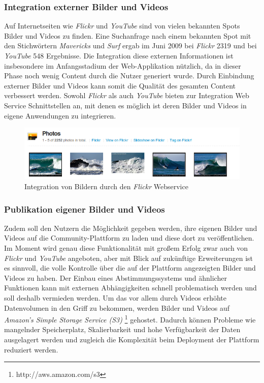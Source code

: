 \subsubsection{Integration externer Bilder und Videos}
Auf Internetseiten wie \textit{Flickr} und \textit{YouTube} sind von
vielen bekannten Spots Bilder und Videos zu finden. Eine Suchanfrage
nach einem bekannten Spot mit den Stichwörtern \textit{Mavericks} und
\textit{Surf} ergab im Juni 2009 bei \textit{Flickr} 2319 und bei
\textit{YouTube} 548 Ergebnisse. Die Integration diese externen
Informationen ist insbesondere im Anfangsstadium der Web-Applikation
nützlich, da in dieser Phase noch wenig Content durch die Nutzer
generiert wurde. Durch Einbindung externer Bilder und Videos kann
somit die Qualität des gesamten Content verbessert werden. Sowohl
\textit{Flickr} als auch \textit{YouTube} bieten zur Integration Web
Service Schnittstellen an, mit denen es möglich ist deren Bilder und
Videos in eigene Anwendungen zu integrieren.

\begin{figure}[h]
 \includegraphics[width=\textwidth]{bilder/photos-flickr}
 \caption{Integration von Bildern durch den \textit{Flickr}
      Webservice}
 \label{photos-flickr}
\end{figure}

\subsubsection{Publikation eigener Bilder und Videos}
Zudem soll den Nutzern die Möglichkeit gegeben werden, ihre eigenen
Bilder und Videos auf die Community-Plattform zu laden und diese dort
zu veröffentlichen. Im Moment wird genau diese Funktionalität mit
großem Erfolg zwar auch von \textit{Flickr} und \textit{YouTube}
angeboten, aber mit Blick auf zukünftige Erweiterungen ist es
sinnvoll, die volle Kontrolle über die auf der Plattform angezeigten
Bilder und Videos zu haben. Der Einbau eines Abstimmungssystems und
ähnlicher Funktionen kann mit externen Abhängigkeiten schnell
problematisch werden und soll deshalb vermieden werden. Um das vor
allem durch Videos erhöhte Datenvolumen in den Griff zu bekommen,
werden Bilder und Videos auf \textit{Amazon's Simple Storage Service
  (S3)} \footnote{http://aws.amazon.com/s3} gehostet. Dadurch können
Probleme wie mangelnder Speicherplatz, Skalierbarkeit und hohe
Verfügbarkeit der Daten ausgelagert werden und zugleich die
Komplexität beim Deployment der Plattform reduziert werden.


